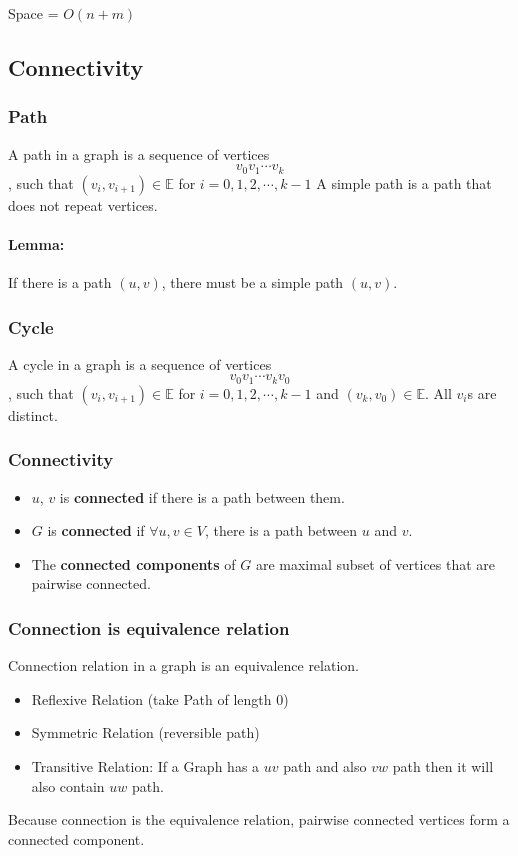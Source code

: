 \documentclass[en,hazy,blue,normal,12pt]{elegantnote}
\begin{document}
Space = $O(n + m)$
\subsection{Connectivity}
\subsubsection{Path}
A path in a graph is a sequence of vertices
\[v_0 v_1 \cdots v_k\]
, such that $(v_i, v_{i+1}) \in \mathbb{E}$ for $i = 0, 1, 2, \cdots, k-1$
A simple path is a path that does not repeat vertices.
\paragraph{Lemma:}
If there is a path $(u, v)$, there must be a simple path $(u, v)$.
\subsubsection{Cycle}
A cycle in a graph is a sequence of vertices
\[v_0 v_1 \cdots v_kv_0\]
, such that $(v_i, v_{i+1}) \in \mathbb{E}$ for $i = 0, 1, 2, \cdots, k-1$ and 
$(v_k, v_{0}) \in \mathbb{E}$. All $v_i$s are distinct.

\subsubsection{Connectivity}
\begin{itemize}
 \item $u$, $v$ is \textbf{connected} if there is a path between them.
 \item $G$ is \textbf{connected} if $\forall u, v \in V$, there is a path 
between $u$ and $v$.
\item The \textbf{connected components} of $G$ are maximal subset of vertices 
that are pairwise connected.
\end{itemize}

\subsubsection{Connection is equivalence relation}
Connection relation in a graph is an equivalence relation.
\begin{itemize}
 \item Reflexive Relation (take Path of length 0)
 \item Symmetric Relation (reversible path)
 \item Transitive Relation: If a Graph has a $uv$ path and also $vw$ path then 
it will also contain $uw$ path.
\end{itemize}
Because connection is the equivalence relation, pairwise connected vertices 
form a connected component.
\end{document}
